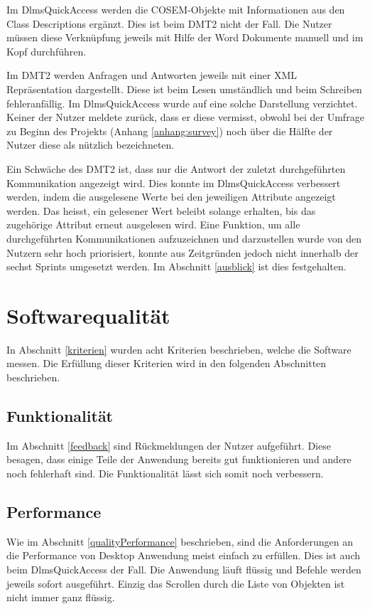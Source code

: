 Im DlmsQuickAccess werden die \ac{COSEM}-Objekte mit Informationen aus den Class Descriptions ergänzt.
Dies ist beim \ac{DMT2} nicht der Fall.
Die Nutzer müssen diese Verknüpfung jeweils mit Hilfe der Word Dokumente manuell und im Kopf durchführen.

Im \ac{DMT2} werden Anfragen und Antworten jeweils mit einer XML Repräsentation dargestellt.
Diese ist beim Lesen umständlich und beim Schreiben fehleranfällig.
Im DlmsQuickAccess wurde auf eine solche Darstellung verzichtet.
Keiner der Nutzer meldete zurück, dass er diese vermisst, obwohl bei der Umfrage zu Beginn des Projekts (Anhang \ref{anhang:survey}) noch über die Hälfte der Nutzer diese als nützlich bezeichneten.

Ein Schwäche des \ac{DMT2} ist, dass nur die Antwort der zuletzt durchgeführten Kommunikation angezeigt wird.
Dies konnte im DlmsQuickAccess verbessert werden, indem die ausgelesene Werte bei den jeweiligen Attribute angezeigt werden.
Das heisst, ein gelesener Wert beleibt solange erhalten, bis das zugehörige Attribut erneut ausgelesen wird.
Eine Funktion, um alle durchgeführten Kommunikationen aufzuzeichnen und darzustellen wurde von den Nutzern sehr hoch priorisiert, konnte aus Zeitgründen jedoch nicht innerhalb der sechst Sprints umgesetzt werden.
Im Abschnitt \ref{ausblick} ist dies festgehalten.



\section{Softwarequalität}\label{evalQuality}
In Abschnitt \ref{kriterien} wurden acht Kriterien beschrieben, welche die Software messen.
Die Erfüllung dieser Kriterien wird in den folgenden Abschnitten beschrieben.

\subsection{Funktionalität}
Im Abschnitt \ref{feedback} sind Rückmeldungen der Nutzer aufgeführt.
Diese besagen, dass einige Teile der Anwendung bereits gut funktionieren und andere noch fehlerhaft sind.
Die Funktionalität lässt sich somit noch verbessern.

\subsection{Performance}
Wie im Abschnitt \ref{qualityPerformance} beschrieben, sind die Anforderungen an die Performance von Desktop Anwendung meist einfach zu erfüllen.
Dies ist auch beim DlmsQuickAccess der Fall.
Die Anwendung läuft flüssig und Befehle werden jeweils sofort ausgeführt.
Einzig das Scrollen durch die Liste von Objekten ist nicht immer ganz flüssig.

